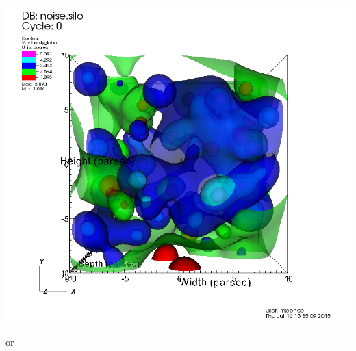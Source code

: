 \begin{frame}
\begin{columns}
\begin{column}{5.5cm}
        \vspace{3mm}
        \includegraphics[width=\columnwidth]{figs/visit-pract/VisIt_contour1b}

        \pause
        \vspace{3mm}
        \textcolor{DarkBlue}{}
        or
\end{column}
\end{columns}
\end{frame}

